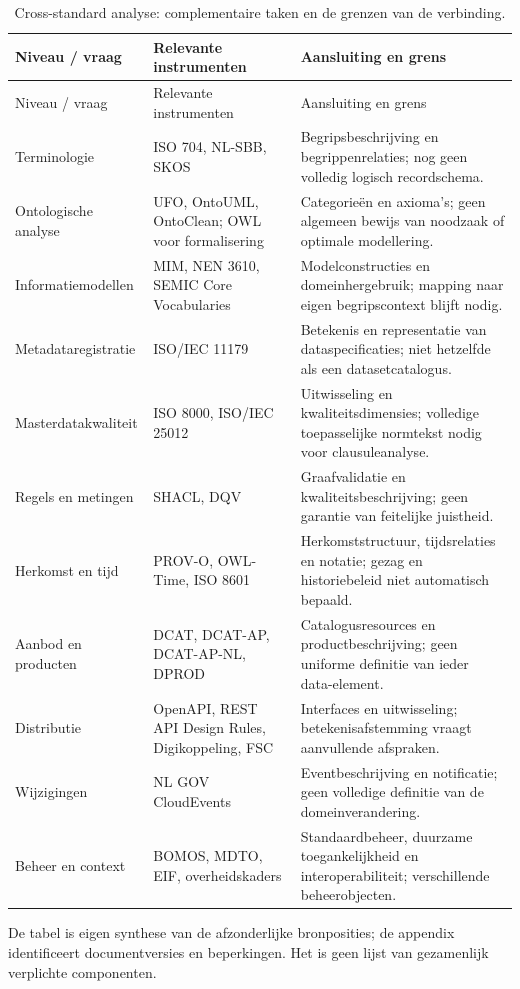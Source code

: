 \begin{longtable}{@{}P{.19\linewidth}P{.35\linewidth}P{.38\linewidth}@{}}
\caption{Cross-standard analyse: complementaire taken en de grenzen van de verbinding.}\label{tab:landscape}\\
\toprule Niveau / vraag & Relevante instrumenten & Aansluiting en grens \\\midrule\endfirsthead
\toprule Niveau / vraag & Relevante instrumenten & Aansluiting en grens \\\midrule\endhead
Terminologie & ISO 704, NL-SBB, SKOS & Begripsbeschrijving en begrippenrelaties; nog geen volledig logisch recordschema. \\
Ontologische analyse & UFO, OntoUML, OntoClean; OWL voor formalisering & Categorieën en axioma's; geen algemeen bewijs van noodzaak of optimale modellering. \\
Informatie\-modellen & MIM, NEN 3610, SEMIC Core Vocabularies & Modelconstructies en domeinhergebruik; mapping naar eigen begripscontext blijft nodig. \\
Metadata\-registratie & ISO/IEC 11179 & Betekenis en representatie van dataspecificaties; niet hetzelfde als een datasetcatalogus. \\
Masterdata\-kwaliteit & ISO 8000, ISO/IEC 25012 & Uitwisseling en kwaliteitsdimensies; volledige toepasselijke normtekst nodig voor clausuleanalyse. \\
Regels en metingen & SHACL, DQV & Graafvalidatie en kwaliteitsbeschrijving; geen garantie van feitelijke juistheid. \\
Herkomst en tijd & PROV-O, OWL-Time, ISO 8601 & Herkomststructuur, tijdsrelaties en notatie; gezag en historiebeleid niet automatisch bepaald. \\
Aanbod en producten & DCAT, DCAT-AP, DCAT-AP-NL, DPROD & Catalogusresources en productbeschrijving; geen uniforme definitie van ieder data-element. \\
Distributie & OpenAPI, REST API Design Rules, Digikoppeling, FSC & Interfaces en uitwisseling; betekenisafstemming vraagt aanvullende afspraken. \\
Wijzigingen & NL GOV CloudEvents & Eventbeschrijving en notificatie; geen volledige definitie van de domeinverandering. \\
Beheer en context & BOMOS, MDTO, EIF, overheidskaders & Standaardbeheer, duurzame toegankelijkheid en interoperabiliteit; verschillende beheerobjecten. \\
\bottomrule
\end{longtable}
De tabel is eigen synthese van de afzonderlijke bronposities; de appendix identificeert documentversies en beperkingen. Het is geen lijst van gezamenlijk verplichte componenten.

